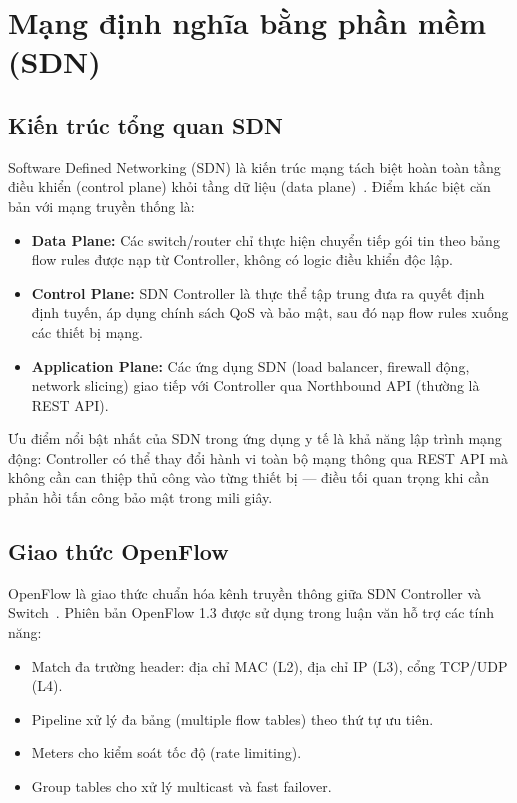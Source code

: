 \section{Mạng định nghĩa bằng phần mềm (SDN)}

\subsection{Kiến trúc tổng quan SDN}

Software Defined Networking (SDN) là kiến trúc mạng tách biệt hoàn toàn tầng điều khiển (control plane) khỏi tầng dữ liệu (data plane)~\cite{mckeown2008openflow}. Điểm khác biệt căn bản với mạng truyền thống là:

\begin{itemize}
    \item \textbf{Data Plane:} Các switch/router chỉ thực hiện chuyển tiếp gói tin theo bảng flow rules được nạp từ Controller, không có logic điều khiển độc lập.
    \item \textbf{Control Plane:} SDN Controller là thực thể tập trung đưa ra quyết định định tuyến, áp dụng chính sách QoS và bảo mật, sau đó nạp flow rules xuống các thiết bị mạng.
    \item \textbf{Application Plane:} Các ứng dụng SDN (load balancer, firewall động, network slicing) giao tiếp với Controller qua Northbound API (thường là REST API).
\end{itemize}

Ưu điểm nổi bật nhất của SDN trong ứng dụng y tế là khả năng lập trình mạng động: Controller có thể thay đổi hành vi toàn bộ mạng thông qua REST API mà không cần can thiệp thủ công vào từng thiết bị — điều tối quan trọng khi cần phản hồi tấn công bảo mật trong mili giây.

\subsection{Giao thức OpenFlow}

OpenFlow là giao thức chuẩn hóa kênh truyền thông giữa SDN Controller và Switch~\cite{mckeown2008openflow}. Phiên bản OpenFlow 1.3 được sử dụng trong luận văn hỗ trợ các tính năng:

\begin{itemize}
    \item Match đa trường header: địa chỉ MAC (L2), địa chỉ IP (L3), cổng TCP/UDP (L4).
    \item Pipeline xử lý đa bảng (multiple flow tables) theo thứ tự ưu tiên.
    \item Meters cho kiểm soát tốc độ (rate limiting).
    \item Group tables cho xử lý multicast và fast failover.
\end{itemize}

